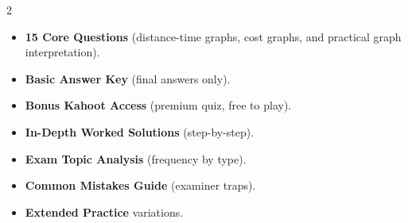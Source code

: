 \documentclass[11pt,a4paper]{article}
\newcommand{\FullReleaseDate}{April 30, 2026}
\begin{document}
\vspace{8pt}

\begin{multicols}{2}
  \begin{tcolorbox}[card, title=\sffamily\bfseries\textcolor{white}{\faHandPointDown\ TODAY (Simplified Version)}, colbacktitle=mainblue, boxed title style={sharp corners, boxrule=0pt}]
    \begin{itemize}[leftmargin=1.2em, itemsep=2pt]
      \item \small \textbf{15 Core Questions} (distance-time graphs, cost graphs, and practical graph interpretation).
      \item \small \textbf{Basic Answer Key} (final answers only).
      \item \small \textbf{Bonus Kahoot Access} (premium quiz, free to play).
    \end{itemize}
  \end{tcolorbox}

  \columnbreak

  \begin{tcolorbox}[card, title=\sffamily\bfseries\textcolor{white}{\faRocket\ ON \FullReleaseDate\ (Full Upgrade)}, colbacktitle=mainblue, boxed title style={sharp corners, boxrule=0pt}]
    \begin{itemize}[leftmargin=1.2em, itemsep=2pt]
      \item \small \textbf{In-Depth Worked Solutions} (step-by-step).
      \item \small \textbf{Exam Topic Analysis} (frequency by type).
      \item \small \textbf{Common Mistakes Guide} (examiner traps).
      \item \small \textbf{Extended Practice} variations.
    \end{itemize}
  \end{tcolorbox}
\end{multicols}
\end{document}
